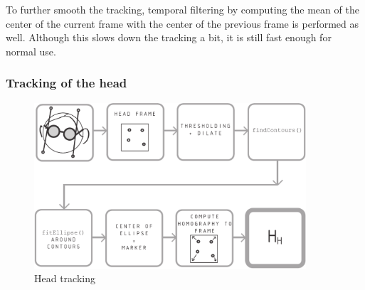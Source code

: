 To further smooth the tracking, temporal filtering by computing the mean of the center of the current frame with the center of the previous frame is performed as well. 
Although this slows down the tracking a bit, it is still fast enough for normal use.

\subsubsection{Tracking of the head}
\begin{figure}[H]
  \centering
  \includegraphics[width=0.9\textwidth]{../finalpres/03c.pdf}
  \caption{Head tracking}\label{fig:head}
\end{figure}

